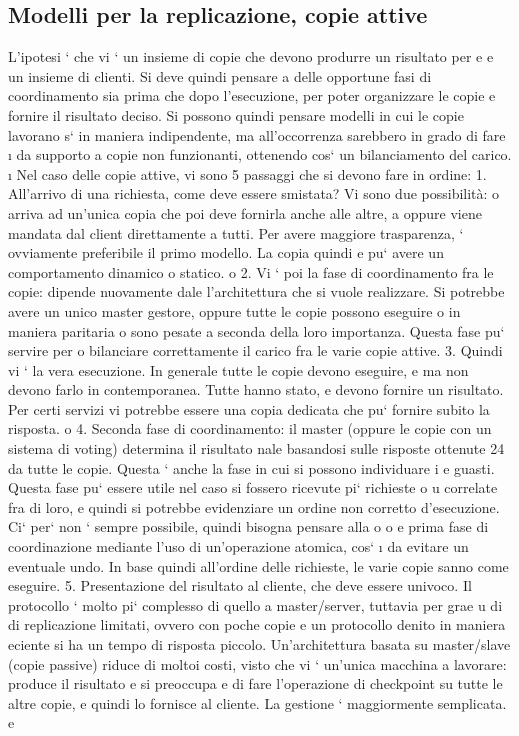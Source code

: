 \documentclass[a4paper,12pt]{article}
\begin{document}
\subsection{Modelli per la replicazione, copie attive}
L'ipotesi ` che vi ` un insieme di copie che devono produrre un risultato per
e
e
un insieme di clienti. Si deve quindi pensare a delle opportune fasi di coordinamento sia prima che dopo l'esecuzione,
per poter organizzare le copie e
fornire il risultato deciso. Si possono quindi pensare modelli in cui le copie lavorano s` in maniera indipendente, ma
all'occorrenza sarebbero in grado di fare
\i{}
da supporto a copie non funzionanti, ottenendo cos` un bilanciamento del carico.
\i{}
Nel caso delle copie attive, vi sono 5 passaggi che si devono fare in ordine:
1. All'arrivo di una richiesta, come deve essere smistata? Vi sono due possibilità: o arriva ad un'unica copia che poi
deve fornirla anche alle altre,
a
oppure viene mandata dal client direttamente a tutti. Per avere maggiore
trasparenza, ` ovviamente preferibile il primo modello. La copia quindi
e
pu` avere un comportamento dinamico o statico.
o
2. Vi ` poi la fase di coordinamento fra le copie: dipende nuovamente dale
l'architettura che si vuole realizzare. Si potrebbe avere un unico master
gestore, oppure tutte le copie possono eseguire o in maniera paritaria o
sono pesate a seconda della loro importanza. Questa fase pu` servire per
o
bilanciare correttamente il carico fra le varie copie attive.
3. Quindi vi ` la vera esecuzione. In generale tutte le copie devono eseguire,
e
ma non devono farlo in contemporanea. Tutte hanno stato, e devono
fornire un risultato. Per certi servizi vi potrebbe essere una copia dedicata
che pu` fornire subito la risposta.
o
4. Seconda fase di coordinamento: il master (oppure le copie con un sistema
di voting) determina il risultato nale basandosi sulle risposte ottenute
24
da tutte le copie. Questa ` anche la fase in cui si possono individuare i
e
guasti. Questa fase pu` essere utile nel caso si fossero ricevute pi` richieste
o
u
correlate fra di loro, e quindi si potrebbe evidenziare un ordine non corretto
d'esecuzione. Ci` per` non ` sempre possibile, quindi bisogna pensare alla
o
o
e
prima fase di coordinazione mediante l'uso di un'operazione atomica, cos`
\i{}
da evitare un eventuale undo. In base quindi all'ordine delle richieste, le
varie copie sanno come eseguire.
5. Presentazione del risultato al cliente, che deve essere univoco.
Il protocollo ` molto pi` complesso di quello a master/server, tuttavia per grae
u
di di replicazione limitati, ovvero con poche copie e un protocollo denito in
maniera eciente si ha un tempo di risposta piccolo.
Un'architettura basata su master/slave (copie passive) riduce di moltoi costi,
visto che vi ` un'unica macchina a lavorare: produce il risultato e si preoccupa
e
di fare l'operazione di checkpoint su tutte le altre copie, e quindi lo fornisce al
cliente. La gestione ` maggiormente semplicata.
e
\end{document}
